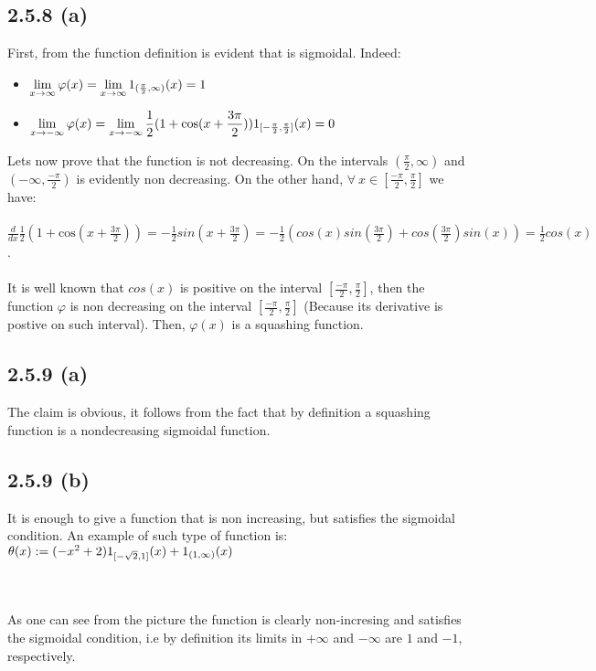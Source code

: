\documentclass{exam}
\begin{document}
\subsection*{2.5.8 (a)}
 First, from the function definition is evident that is sigmoidal. Indeed:
\begin{itemize}
    \item $\displaystyle\lim_{x \to \infty}\varphi(x) = \lim_{x \to \infty} 1_{\tiny (\frac{\pi}{2}, \infty)}(x) = 1$  
    \item $\displaystyle\lim_{x \to -\infty}\varphi(x) = \lim_{x \to -\infty}\frac{1}{2}(1 + \text{cos}(x + \frac{3\pi}{2}))1_{\tiny [-\frac{\pi}{2}, \frac{\pi}{2}]}(x) = 0$
\end{itemize}
Lets now prove that the function is not decreasing. On the intervals $(\frac{\pi}{2}, \infty)$ and $(-\infty, \frac{-\pi}{2})$ is evidently non decreasing. On the other hand, $\forall \ x \in [\frac{-\pi}{2}, \frac{\pi}{2}]$ we have: \\
\\
$\frac{d}{ d x}\frac{1}{2}(1 + \text{cos}(x + \frac{3\pi}{2})) = - \frac{1}{2}sin(x + \frac{3\pi}{2}) = - \frac{1}{2}(cos(x)sin(\frac{3\pi}{2}) + cos(\frac{3\pi}{2})sin(x)) = \frac{1}{2}cos(x)$. \\
\\
It is well known that $cos(x)$ is positive on the interval $[\frac{-\pi}{2}, \frac{\pi}{2}]$, then the function $\varphi$ is non decreasing on the interval $[\frac{-\pi}{2}, \frac{\pi}{2}]$ (Because its derivative is postive on such interval). Then, $\varphi(x)$ is a squashing function. 

\subsection*{2.5.9 (a)}
The claim is obvious, it follows from the fact that by definition a squashing function is a nondecreasing sigmoidal function. 

\subsection*{2.5.9 (b)}
It is enough to give a function that is non increasing, but satisfies the sigmoidal condition. An example of such type of function is:
$\theta(x):= (-x^2 + 2)1_{\tiny [-\sqrt{2},1]}(x) + 1_{\tiny (1, \infty)}(x)$\\
\\
\\
As one can see from the picture the function is clearly non-incresing and satisfies the sigmoidal condition, i.e by definition its limits in $+\infty$ and 
$-\infty$ are $1$ and $-1$, respectively.
\end{document}
